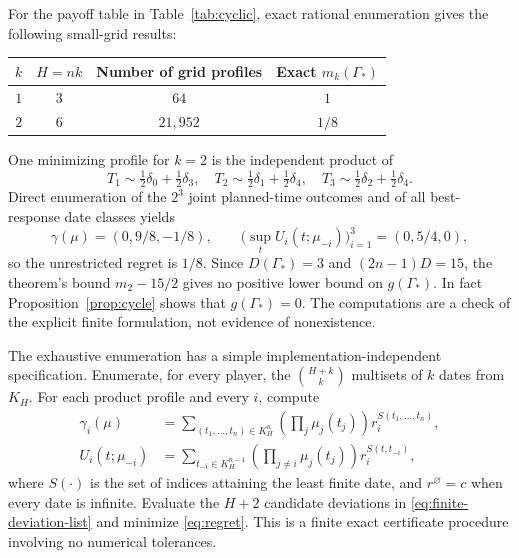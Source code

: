 \documentclass[11pt,a4paper]{article}
\numberwithin{equation}{section}
\theoremstyle{plain}
\theoremstyle{definition}
\theoremstyle{remark}
\begin{document}
For the payoff table in Table~\ref{tab:cyclic}, exact rational
enumeration gives the following small-grid results:
\begin{center}
\begin{tabular}{@{}cccc@{}}\toprule
$k$ & $H=nk$ & Number of grid profiles & Exact $m_k(\Gamma_*)$\\\midrule
$1$ & $3$ & $64$ & $1$\\
$2$ & $6$ & $21{,}952$ & $1/8$\\\bottomrule
\end{tabular}
\end{center}
One minimizing profile for $k=2$ is the independent product of
\begin{equation}\label{eq:grid-min-example}
 T_1\sim\tfrac12\delta_0+\tfrac12\delta_3,\quad
 T_2\sim\tfrac12\delta_1+\tfrac12\delta_4,\quad
 T_3\sim\tfrac12\delta_2+\tfrac12\delta_4.
\end{equation}
Direct enumeration of the $2^3$ joint planned-time outcomes and of all
best-response date classes yields
\begin{equation}\label{eq:grid-min-payoff}
 \gamma(\mu)=(0,9/8,-1/8),\qquad
 \bigl(\sup_t U_i(t;\mu_{-i})\bigr)_{i=1}^3=(0,5/4,0),
\end{equation}
so the unrestricted regret is $1/8$. Since
$D(\Gamma_*)=3$ and $(2n-1)D=15$, the theorem's bound
$m_2-15/2$ gives no positive lower bound on $g(\Gamma_*)$.
In fact Proposition~\ref{prop:cycle} shows that
$g(\Gamma_*)=0$. The computations are a check of the explicit
finite formulation, not evidence of nonexistence.

The exhaustive enumeration has a simple implementation-independent
specification. Enumerate, for every player, the
$\binom{H+k}{k}$ multisets of $k$ dates from $K_H$. For each product
profile and every $i$, compute
\begin{align*}
 \gamma_i(\mu)
 &=\sum_{(t_1,\ldots,t_n)\in K_H^n}
   \left(\prod_j\mu_j(t_j)\right) r_i^{S(t_1,\ldots,t_n)},\\
 U_i(t;\mu_{-i})
 &=\sum_{t_{-i}\in K_H^{n-1}}
   \left(\prod_{j\ne i}\mu_j(t_j)\right)r_i^{S(t,t_{-i})},
\end{align*}
where $S(\cdot)$ is the set of indices attaining the least finite
date, and $r^\varnothing=c$ when every date is infinite. Evaluate
the $H+2$ candidate deviations in \eqref{eq:finite-deviation-list}
and minimize \eqref{eq:regret}. This is a finite exact certificate
procedure involving no numerical tolerances.
\end{document}
